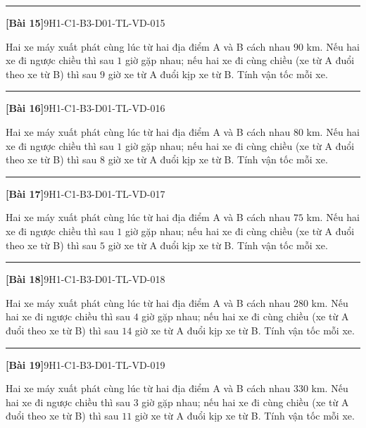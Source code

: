 \documentclass[12pt,a4paper]{article}
\newif\ifloigiai
\newenvironment{cauhoi}[2]{%
  \par\medskip\noindent\rule{\textwidth}{0.4pt}\par\nopagebreak
  \noindent\textbf{[#1]}\hfill{\scriptsize\ttfamily #2}\par\nopagebreak\smallskip}{\par}
\newcommand{\loigiai}[1]{\ifloigiai\par\smallskip\noindent\textit{Lời giải.} #1\par\fi}
\begin{document}
\begin{cauhoi}{Bài 15}{9H1-C1-B3-D01-TL-VD-015}
Hai xe máy xuất phát cùng lúc từ hai địa điểm A và B cách nhau $90$ km. Nếu hai xe đi ngược chiều thì sau $1$ giờ gặp nhau; nếu hai xe đi cùng chiều (xe từ A đuổi theo xe từ B) thì sau $9$ giờ xe từ A đuổi kịp xe từ B. Tính vận tốc mỗi xe.
\loigiai{Gọi vận tốc xe từ A là $x$ (km/h) và xe từ B là $y$ (km/h), $x>y>0$. Đi ngược chiều: $(x+y)=90$, tức là $x+y=90$. Đi cùng chiều: $9(x-y)=90$, tức là $x-y=10$. Giải hệ ta được $x=50$, $y=40$ (thoả mãn). Vậy vận tốc xe từ A là 50 km/h, xe từ B là 40 km/h.}
\end{cauhoi}
\begin{cauhoi}{Bài 16}{9H1-C1-B3-D01-TL-VD-016}
Hai xe máy xuất phát cùng lúc từ hai địa điểm A và B cách nhau $80$ km. Nếu hai xe đi ngược chiều thì sau $1$ giờ gặp nhau; nếu hai xe đi cùng chiều (xe từ A đuổi theo xe từ B) thì sau $8$ giờ xe từ A đuổi kịp xe từ B. Tính vận tốc mỗi xe.
\loigiai{Gọi vận tốc xe từ A là $x$ (km/h) và xe từ B là $y$ (km/h), $x>y>0$. Đi ngược chiều: $(x+y)=80$, tức là $x+y=80$. Đi cùng chiều: $8(x-y)=80$, tức là $x-y=10$. Giải hệ ta được $x=45$, $y=35$ (thoả mãn). Vậy vận tốc xe từ A là 45 km/h, xe từ B là 35 km/h.}
\end{cauhoi}
\begin{cauhoi}{Bài 17}{9H1-C1-B3-D01-TL-VD-017}
Hai xe máy xuất phát cùng lúc từ hai địa điểm A và B cách nhau $75$ km. Nếu hai xe đi ngược chiều thì sau $1$ giờ gặp nhau; nếu hai xe đi cùng chiều (xe từ A đuổi theo xe từ B) thì sau $5$ giờ xe từ A đuổi kịp xe từ B. Tính vận tốc mỗi xe.
\loigiai{Gọi vận tốc xe từ A là $x$ (km/h) và xe từ B là $y$ (km/h), $x>y>0$. Đi ngược chiều: $(x+y)=75$, tức là $x+y=75$. Đi cùng chiều: $5(x-y)=75$, tức là $x-y=15$. Giải hệ ta được $x=45$, $y=30$ (thoả mãn). Vậy vận tốc xe từ A là 45 km/h, xe từ B là 30 km/h.}
\end{cauhoi}
\begin{cauhoi}{Bài 18}{9H1-C1-B3-D01-TL-VD-018}
Hai xe máy xuất phát cùng lúc từ hai địa điểm A và B cách nhau $280$ km. Nếu hai xe đi ngược chiều thì sau $4$ giờ gặp nhau; nếu hai xe đi cùng chiều (xe từ A đuổi theo xe từ B) thì sau $14$ giờ xe từ A đuổi kịp xe từ B. Tính vận tốc mỗi xe.
\loigiai{Gọi vận tốc xe từ A là $x$ (km/h) và xe từ B là $y$ (km/h), $x>y>0$. Đi ngược chiều: $4(x+y)=280$, tức là $x+y=70$. Đi cùng chiều: $14(x-y)=280$, tức là $x-y=20$. Giải hệ ta được $x=45$, $y=25$ (thoả mãn). Vậy vận tốc xe từ A là 45 km/h, xe từ B là 25 km/h.}
\end{cauhoi}
\begin{cauhoi}{Bài 19}{9H1-C1-B3-D01-TL-VD-019}
Hai xe máy xuất phát cùng lúc từ hai địa điểm A và B cách nhau $330$ km. Nếu hai xe đi ngược chiều thì sau $3$ giờ gặp nhau; nếu hai xe đi cùng chiều (xe từ A đuổi theo xe từ B) thì sau $11$ giờ xe từ A đuổi kịp xe từ B. Tính vận tốc mỗi xe.
\loigiai{Gọi vận tốc xe từ A là $x$ (km/h) và xe từ B là $y$ (km/h), $x>y>0$. Đi ngược chiều: $3(x+y)=330$, tức là $x+y=110$. Đi cùng chiều: $11(x-y)=330$, tức là $x-y=30$. Giải hệ ta được $x=70$, $y=40$ (thoả mãn). Vậy vận tốc xe từ A là 70 km/h, xe từ B là 40 km/h.}
\end{cauhoi}
\end{document}

